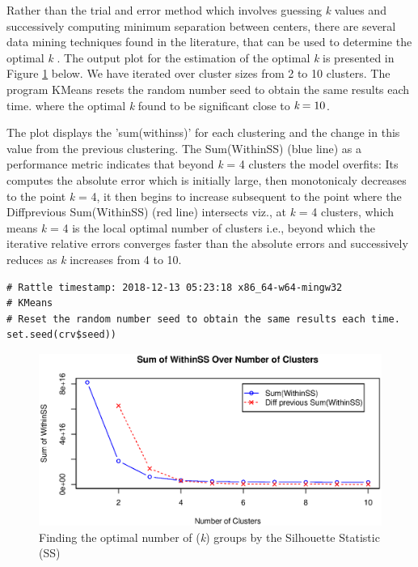 \documentclass[a4paper]{article}
\begin{document}
Rather than the trial and error method which involves guessing \emph{k} values and successively computing minimum separation between centers, there are several data mining techniques found in the literature, that can be used to determine the optimal \emph{k} \citep{rousseeuw1987silhouettes}. The output plot for the estimation of the optimal \emph{k} is presented in Figure \ref{Fig5} below. We have iterated over cluster sizes from 2 to 10 clusters. The program KMeans resets the random number seed to obtain the same results each time. where the optimal \emph{k} found to be significant close to $\emph{k} = 10$.\medskip

The plot displays the 'sum(withinss)' for each clustering and the change in this value from the previous clustering. The Sum(WithinSS) (blue line) as a performance metric indicates that beyond \emph{k} = 4 clusters the model overfits: Its computes the absolute error which is initially  large, then monotonicaly decreases to the point \emph{k} = 4, it then begins to increase subsequent to the point where the Diffprevious Sum(WithinSS) (red line) intersects viz., at \emph{k} = 4 clusters, which means \emph{k} = 4 is the local optimal number of clusters i.e., beyond which the iterative relative errors converges faster than the absolute errors and successively reduces as \emph{k} increases from 4 to 10.  

\begin{verbatim}
# Rattle timestamp: 2018-12-13 05:23:18 x86_64-w64-mingw32 
# KMeans 
# Reset the random number seed to obtain the same results each time.
set.seed(crv$seed))
\end{verbatim}
\begin{figure}
\centering
\includegraphics[scale=0.7]{IterateKmeans.eps}
\caption[SS measure]{Finding the optimal number of (\emph{k}) groups by the Silhouette Statistic (SS)}
\label{Fig5}
\end{figure}
\end{document}
